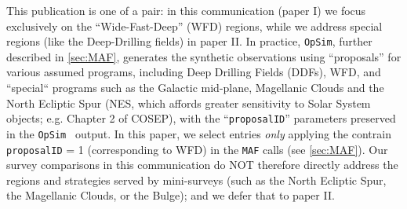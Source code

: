 \documentclass[onecolumn, 10pt]{aastex63}
\newcommand{\question}[1]{{\color{red} #1}}
\newcommand{\opsim}{\texttt{OpSim}}
\begin{document}
{This publication is one of a pair: in this communication (paper I) we focus exclusively on the ``Wide-Fast-Deep'' (WFD) regions, while we address special regions (like the Deep-Drilling fields) in paper II. %
In practice, \opsim, further described in \autoref{sec:MAF}, generates the synthetic observations using ``proposals'' for various assumed programs, including Deep Drilling Fields (DDFs), WFD, and ``special`` programs such as the Galactic mid-plane, Magellanic Clouds and the North Ecliptic Spur (NES, which affords greater sensitivity to Solar System objects; e.g. Chapter 2 of COSEP), with the ``{\tt proposalID}'' parameters preserved in the \opsim~ output. In this paper, we select entries {\it only} applying the contrain {\tt proposalID} = 1 (corresponding to WFD) in the \texttt{MAF} calls (see \autoref{sec:MAF}). Our survey comparisons in this communication do NOT therefore directly address the regions and strategies served by mini-surveys (such as the North Ecliptic Spur, the Magellanic Clouds, or the Bulge); and we defer that to paper II.}%
\end{document}
